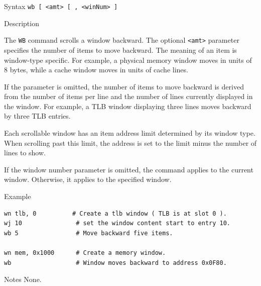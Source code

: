 %
%
\pagebreak
{}

\begin{iPageDescEntry}{Syntax}
\texttt{wb [ <amt> [ , <winNum> ]} \\
\end{iPageDescEntry}

\begin{iPageDescEntry}{Description}

The \texttt{WB} command scrolls a window backward. The optional \texttt{<amt>} parameter specifies the number of items to move backward. The meaning of an item is window-type specific. For example, a physical memory window moves in units of 8 bytes, while a cache window moves in units of cache lines. 

If the parameter is omitted, the number of items to move backward is derived from the number of items per line and the number of lines currently displayed in the window. For example, a TLB window displaying three lines moves backward by three TLB entries.

Each scrollable window has an item address limit determined by its window type. When scrolling past this limit, the address is set to the limit minus the number of lines to show.

If the window number parameter is omitted, the command applies to the current window. Otherwise, it applies to the specified window.
\end{iPageDescEntry}

\begin{iPageDescOpEntry}{Example}
\begin{lstlisting}[style=iPageOpStyle]
wn tlb, 0          # Create a tlb window ( TLB is at slot 0 ).
wj 10               # set the window content start to entry 10.
wb 5                # Move backward five items.

wn mem, 0x1000      # Create a memory window.
wb                  # Window moves backward to address 0x0F80.
\end{lstlisting}
\end{iPageDescOpEntry}

\begin{iPageDescEntry}{Notes}
None.
\end{iPageDescEntry}
